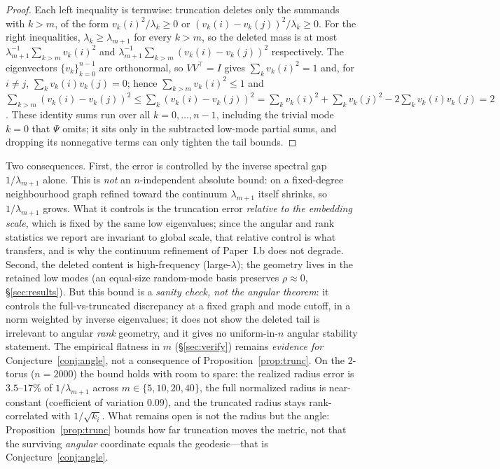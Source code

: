 \documentclass[11pt]{article}
\theoremstyle{remark}
\begin{document}
\begin{proof}
Each left inequality is termwise: truncation deletes only the summands with
$k>m$, of the form $v_k(i)^2/\lambda_k\ge0$ or
$(v_k(i)-v_k(j))^2/\lambda_k\ge0$. For the right inequalities,
$\lambda_k\ge\lambda_{m+1}$ for every $k>m$, so the deleted mass is at most
$\lambda_{m+1}^{-1}\sum_{k>m}v_k(i)^2$ and
$\lambda_{m+1}^{-1}\sum_{k>m}(v_k(i)-v_k(j))^2$ respectively. The eigenvectors
$\{v_k\}_{k=0}^{n-1}$ are orthonormal, so $VV^{\top}=I$ gives $\sum_k v_k(i)^2=1$
and, for $i\neq j$, $\sum_k v_k(i)v_k(j)=0$; hence $\sum_{k>m}v_k(i)^2\le1$ and
$\sum_{k>m}(v_k(i)-v_k(j))^2\le\sum_k(v_k(i)-v_k(j))^2
=\sum_k v_k(i)^2+\sum_k v_k(j)^2-2\sum_k v_k(i)v_k(j)=2$. These identity sums run
over all $k=0,\dots,n-1$, including the trivial mode $k=0$ that $\Psi$ omits; it
sits only in the subtracted low-mode partial sums, and dropping its nonnegative
terms can only tighten the tail bounds.
\end{proof}

Two consequences. First, the error is controlled by the inverse spectral gap
$1/\lambda_{m+1}$ alone. This is \emph{not} an $n$-independent absolute bound: on a
fixed-degree neighbourhood graph refined toward the continuum $\lambda_{m+1}$
itself shrinks, so $1/\lambda_{m+1}$ grows. What it controls is the truncation
error \emph{relative to the embedding scale}, which is fixed by the same low
eigenvalues; since the angular and rank statistics we report are invariant to
global scale, that relative control is what transfers, and is why the continuum
refinement of Paper~I.b does not degrade. Second, the deleted content is
high-frequency (large-$\lambda$); the geometry lives in the retained low modes
(an equal-size random-mode basis preserves $\rho\approx0$, \S\ref{sec:results}).
But this bound is a \emph{sanity check, not the angular theorem}: it controls
the full-vs-truncated discrepancy at a fixed graph and mode cutoff, in a norm
weighted by inverse eigenvalues; it does not show the deleted tail is
irrelevant to angular \emph{rank} geometry, and it gives no uniform-in-$n$
angular stability statement. The empirical flatness in $m$
(\S\ref{sec:verify}) remains \emph{evidence for}
Conjecture~\ref{conj:angle}, not a consequence of
Proposition~\ref{prop:trunc}. On the 2-torus
($n=2000$) the bound holds with room to spare: the realized radius error is
$3.5$--$17\%$ of $1/\lambda_{m+1}$ across $m\in\{5,10,20,40\}$, the full
normalized radius is near-constant (coefficient of variation $0.09$), and the
truncated radius stays rank-correlated with $1/\sqrt{k_i}$. What remains open is
not the radius but the angle: Proposition~\ref{prop:trunc} bounds how far
truncation moves the metric, not that the surviving \emph{angular} coordinate
equals the geodesic---that is Conjecture~\ref{conj:angle}.
\end{document}
